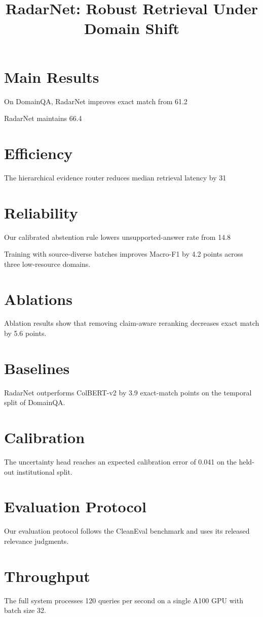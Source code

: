 \documentclass{article}
\title{RadarNet: Robust Retrieval Under Domain Shift}
\begin{document}
\maketitle

\section{Main Results}
On DomainQA, RadarNet improves exact match from 61.2%

RadarNet maintains 66.4%

\section{Efficiency}
The hierarchical evidence router reduces median retrieval latency by 31%

\section{Reliability}
Our calibrated abstention rule lowers unsupported-answer rate from 14.8%

Training with source-diverse batches improves Macro-F1 by 4.2 points across three low-resource domains.

\section{Ablations}
Ablation results show that removing claim-aware reranking decreases exact match by 5.6 points.

\section{Baselines}
RadarNet outperforms ColBERT-v2 by 3.9 exact-match points on the temporal split of DomainQA.

\section{Calibration}
The uncertainty head reaches an expected calibration error of 0.041 on the held-out institutional split.

\section{Evaluation Protocol}
Our evaluation protocol follows the CleanEval benchmark and uses its released relevance judgments.

\section{Throughput}
The full system processes 120 queries per second on a single A100 GPU with batch size 32.
\end{document}
